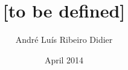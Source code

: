\documentclass[uk,twoside,onehalfspacing,phd]{risethesis}
\title{[to be defined]}
\date{April 2014}
\author{André Luís Ribeiro Didier}
\begin{document}
\frontmatter
\frontpage
\presentationpage





\tableofcontents
\listoffigures
\listoftables
\listofacronyms
%
\lstlistoflistings
\mainmatter










%

\clearpage
\addappheadtotoc
\appendix
\appendixpage
%
\end{document}
